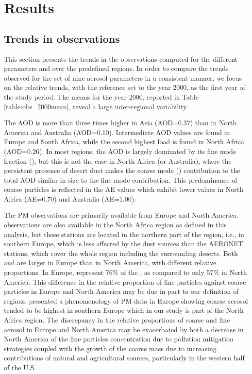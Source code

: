 \documentclass[acp, manuscript]{copernicus}
\begin{document}
\section{Results}

\subsection{Trends in observations}\label{obs_trends}
This section presents the trends in the observations computed for the different parameters and over the predefined regions. In order to compare the trends observed for the set of nine aerosol parameters in a consistent manner, we focus on the relative trends, with the reference set to the year 2000, as the first year of the study period. The means for the year 2000, reported in Table \ref{table:obs_2000mean}, reveal a large inter-regional variability.


The AOD is more than three times higher in Asia (AOD=0.37) than in North America and Australia (AOD=0.10). Intermediate AOD values are found in Europe and South Africa, while the second highest load is found in North Africa (AOD=0.26). In most regions, the AOD is largely dominated by its fine mode fraction (), but this is not the case in North Africa (or Australia), where the persistent presence of desert dust makes the coarse mode () contribution to the total AOD similar in size to the fine mode contribution. This predominance of coarse particles is reflected in the AE values which exhibit lower values in North Africa (AE=0.70) and Australia (AE=1.00).

The PM observations are primarily available from Europe and North America.  observations are also available in the North Africa region as defined in this analysis, but these stations are  located in the northern part of the region, i.e., in southern Europe, which is less affected by the dust sources than the AERONET stations, which cover the whole region including the surrounding deserts. Both  and  are larger in Europe than in North America, with different relative proportions. In Europe,  represent 76\% of the , as compared to only 57\% in North America. This difference in the relative proportion of fine particles against coarse particles in Europe and North America may be due in part to our definition of regions. \cite{PUTAUD20101308} presented a phenomenology of PM data in Europe showing coarse aerosol tended to be highest in southern Europe which in our study is part of the North Africa region. The discrepancy in the relative proportions of coarse and fine aerosol in Europe and North America may be exacerbated by both a decrease in North America of the fine particles concentration due to pollution mitigation strategies coupled with the growth of the coarse mass due to increasing contributions of natural and agricultural sources, particularly in the western half of the U.S. \citep{HAND2019117025}.
\end{document}
